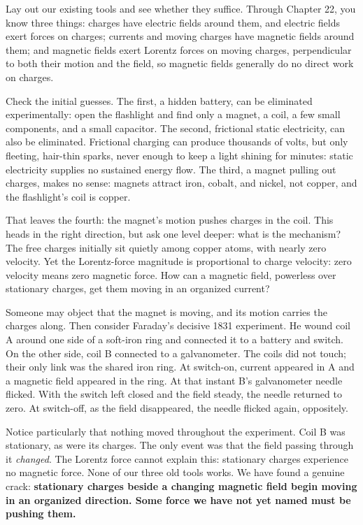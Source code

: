 
Lay out our existing tools and see whether they suffice. Through Chapter 22, you know three things: charges have electric fields around them, and electric fields exert forces on charges; currents and moving charges have magnetic fields around them; and magnetic fields exert Lorentz forces on moving charges, perpendicular to both their motion and the field, so magnetic fields generally do no direct work on charges.

Check the initial guesses. The first, a hidden battery, can be eliminated experimentally: open the flashlight and find only a magnet, a coil, a few small components, and a small capacitor. The second, frictional static electricity, can also be eliminated. Frictional charging can produce thousands of volts, but only fleeting, hair-thin sparks, never enough to keep a light shining for minutes: static electricity supplies no sustained energy flow. The third, a magnet pulling out charges, makes no sense: magnets attract iron, cobalt, and nickel, not copper, and the flashlight's coil is copper.

That leaves the fourth: the magnet's motion pushes charges in the coil. This heads in the right direction, but ask one level deeper: what is the mechanism? The free charges initially sit quietly among copper atoms, with nearly zero velocity. Yet the Lorentz-force magnitude is proportional to charge velocity: zero velocity means zero magnetic force. How can a magnetic field, powerless over stationary charges, get them moving in an organized current?

Someone may object that the magnet is moving, and its motion carries the charges along. Then consider Faraday's decisive 1831 experiment. He wound coil A around one side of a soft-iron ring and connected it to a battery and switch. On the other side, coil B connected to a galvanometer. The coils did not touch; their only link was the shared iron ring. At switch-on, current appeared in A and a magnetic field appeared in the ring. At that instant B's galvanometer needle flicked. With the switch left closed and the field steady, the needle returned to zero. At switch-off, as the field disappeared, the needle flicked again, oppositely.

Notice particularly that nothing moved throughout the experiment. Coil B was stationary, as were its charges. The only event was that the field passing through it \emph{changed}. The Lorentz force cannot explain this: stationary charges experience no magnetic force. None of our three old tools works. We have found a genuine crack: \textbf{stationary charges beside a changing magnetic field begin moving in an organized direction. Some force we have not yet named must be pushing them.}

